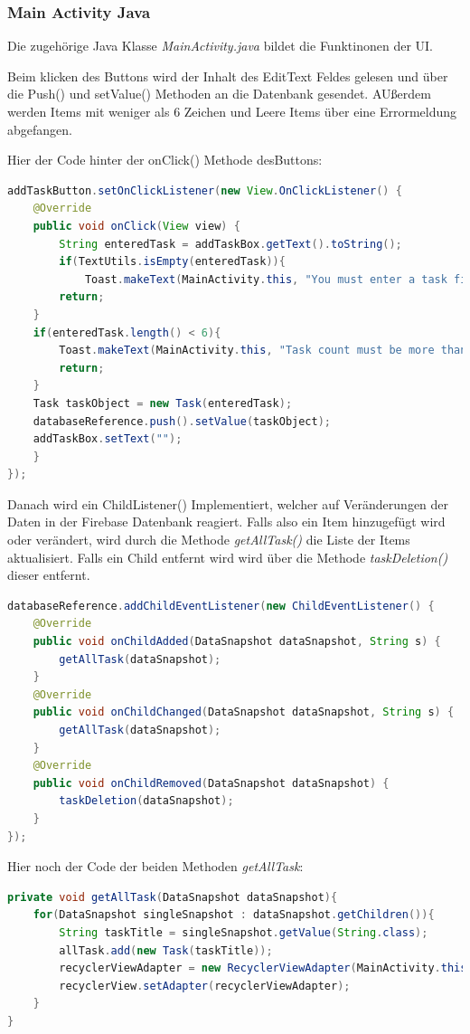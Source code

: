 \subsubsection{Main Activity Java}
Die zugehörige Java Klasse \textit{MainActivity.java} bildet die Funktinonen der UI.

Beim klicken des Buttons wird der Inhalt des EditText Feldes gelesen und über die Push() und setValue() Methoden an die Datenbank gesendet. AUßerdem werden Items mit weniger als 6 Zeichen und Leere Items über eine Errormeldung abgefangen.

Hier der Code hinter der onClick() Methode desButtons:
\begin{lstlisting}[language=java]
addTaskButton.setOnClickListener(new View.OnClickListener() {
	@Override
	public void onClick(View view) {
		String enteredTask = addTaskBox.getText().toString();
		if(TextUtils.isEmpty(enteredTask)){
			Toast.makeText(MainActivity.this, "You must enter a task first", Toast.LENGTH_LONG).show();
		return;
	}
	if(enteredTask.length() < 6){
		Toast.makeText(MainActivity.this, "Task count must be more than 6", Toast.LENGTH_LONG).show();
		return;
	}
	Task taskObject = new Task(enteredTask);
	databaseReference.push().setValue(taskObject);
	addTaskBox.setText("");
	}
});
\end{lstlisting}

Danach wird ein ChildListener() Implementiert, welcher auf Veränderungen der Daten in der Firebase Datenbank reagiert. Falls also ein Item hinzugefügt wird oder verändert, wird durch die Methode \textit{getAllTask()} die Liste der Items aktualisiert. Falls ein Child entfernt wird wird über die Methode \textit{taskDeletion()} dieser entfernt.

\begin{lstlisting}[language=java]
databaseReference.addChildEventListener(new ChildEventListener() {
	@Override
	public void onChildAdded(DataSnapshot dataSnapshot, String s) {
		getAllTask(dataSnapshot);
	}
	@Override
	public void onChildChanged(DataSnapshot dataSnapshot, String s) {
		getAllTask(dataSnapshot);
	}
	@Override
	public void onChildRemoved(DataSnapshot dataSnapshot) {
		taskDeletion(dataSnapshot);
	}
});
\end{lstlisting}

Hier noch der Code der beiden Methoden \textit{getAllTask}:
\begin{lstlisting}[language=java]
private void getAllTask(DataSnapshot dataSnapshot){
	for(DataSnapshot singleSnapshot : dataSnapshot.getChildren()){
		String taskTitle = singleSnapshot.getValue(String.class);
		allTask.add(new Task(taskTitle));
		recyclerViewAdapter = new RecyclerViewAdapter(MainActivity.this, allTask);
		recyclerView.setAdapter(recyclerViewAdapter);
	}
}
\end{lstlisting}

